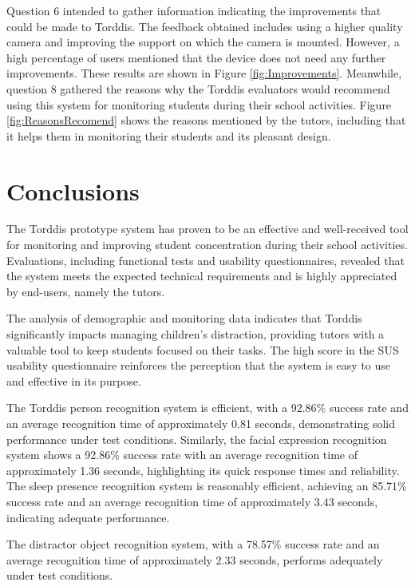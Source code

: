 \documentclass[a4paper,fleqn]{cas-sc}
\begin{document}
				Question 6 intended to gather information indicating the improvements that could be made to Torddis. The feedback obtained includes using a higher quality camera and improving the support on which the camera  is mounted. However, a high percentage of users mentioned that the device does not need any further improvements. These results are shown in Figure \ref{fig:Improvements}. Meanwhile, question 8 gathered the reasons why the Torddis evaluators would recommend using this system for monitoring students during their school activities. Figure \ref{fig:ReasonsRecomend} shows the reasons mentioned by the tutors, including  that it helps them in monitoring their students and its pleasant design.

	\section{Conclusions}
	\label{seccion:Cinco}
		The Torddis prototype system has proven to be an effective and well-received tool for monitoring and improving student concentration during their school activities. Evaluations, including functional tests and usability questionnaires, revealed that the system meets the expected technical requirements and is highly appreciated by end-users, namely the tutors.
		
		The analysis of demographic and monitoring data indicates that Torddis significantly impacts managing children's distraction, providing tutors with a valuable tool to keep students focused on their tasks. The high score in the SUS usability questionnaire reinforces the perception that the system is easy to use and effective in its purpose.
		
		The Torddis person recognition system is efficient, with a 92.86\% success rate and an average recognition time of approximately 0.81 seconds, demonstrating solid performance under test conditions. Similarly, the facial expression recognition system shows a 92.86\% success rate with an average recognition time of approximately 1.36 seconds, highlighting its quick response times and reliability. The sleep presence recognition system is reasonably efficient, achieving an 85.71\% success rate and an average recognition time of approximately 3.43 seconds, indicating adequate performance.
		
		The distractor object recognition system, with a 78.57\% success rate and an average recognition time of approximately 2.33 seconds, performs adequately under test conditions.
		
\end{document}
